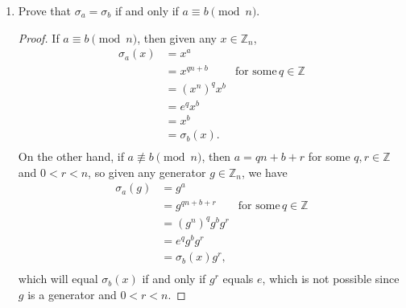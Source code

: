 \documentclass{article}
\begin{document}
\begin{enumerate}
\begin{enumerate}
\begin{enumerate}
          \item Prove that $\sigma_a=\sigma_b$ if and only if $a\equiv b
            \pmod{n}$.
            \begin{proof}
              If $a\equiv b\pmod{n}$, then given any $x\in\mathbb{Z}_n$,
              \begin{align*}
                \sigma_a(x) &= x^a          & \\
                            &= x^{qn+b}     & \text{for some}\, q\in\mathbb{Z} \\
                            &= (x^n)^qx^b   & \\
                            &= e^qx^b       & \\
                            &= x^b          & \\
                            &= \sigma_b(x). & \\
              \end{align*}
              On the other hand, if $a\not\equiv b\pmod{n}$, then
              $a=qn+b+r$ for some $q,r\in\mathbb{Z}$ and $0<r<n$, so given
              any generator $g\in\mathbb{Z}_n$, we have
              \begin{align*}
                \sigma_a(g) &= g^a          & \\
                            &= g^{qn+b+r}   & \text{for some}\, q\in\mathbb{Z} \\
                            &= (g^n)^qg^bg^r& \\
                            &= e^qg^bg^r    & \\
                            &= \sigma_b(x)g^r, & \\
              \end{align*}
              which will equal $\sigma_b(x)$ if and only if $g^r$ equals
              $e$, which is not possible since $g$ is a generator and
              $0<r<n$.
            \end{proof}


\end{enumerate}
\end{enumerate}
\end{enumerate}
\end{document}
